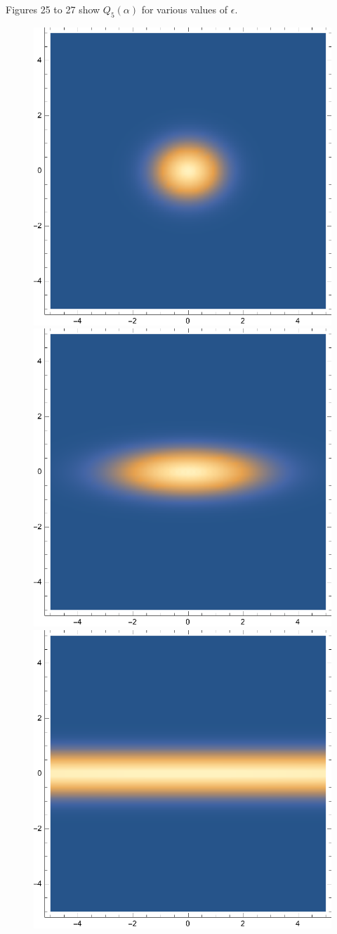 \documentclass{article}
\theoremstyle{definition}
\newcommand{\al}{\alpha}
\begin{document}
\begin{enumerate}[label=\alph*)]
	Figures 25 to 27 show $Q_5(\al)$ for various values of $\epsilon$. 
	
	\begin{figure}[!htb]
	\centering
	\begin{minipage}{.3\textwidth}
  	\centering
  	\includegraphics[width=.55\linewidth]{figures/4-e-02.eps}
	\end{minipage}%
	\begin{minipage}{.3\textwidth}
  	\centering
  	\includegraphics[width=.55\linewidth]{figures/4-e-12.eps}
	\end{minipage}
	\begin{minipage}{.3\textwidth}
  	\centering
  	\includegraphics[width=.55\linewidth]{figures/4-e-40.eps}
	\end{minipage}
	\end{figure} 


\end{enumerate}
\end{document}
